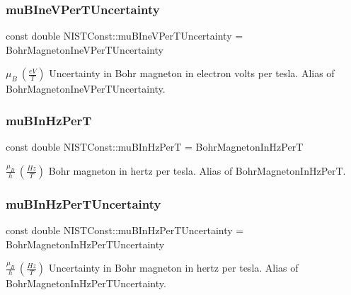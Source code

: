 \subsubsection{\texorpdfstring{mu\+B\+Ine\+V\+Per\+T\+Uncertainty}{muBIneVPerTUncertainty}}
{\footnotesize\ttfamily const double N\+I\+S\+T\+Const\+::mu\+B\+Ine\+V\+Per\+T\+Uncertainty = Bohr\+Magneton\+Ine\+V\+Per\+T\+Uncertainty}

$\mu_B \ (\frac{eV}{T})$ Uncertainty in Bohr magneton in electron volts per tesla. Alias of Bohr\+Magneton\+Ine\+V\+Per\+T\+Uncertainty. \mbox{\label{group___n_i_s_t_const-_bohr_magneton_gac590bf03985de37cfaeea7982dac2aa8}} 
\subsubsection{\texorpdfstring{mu\+B\+In\+Hz\+PerT}{muBInHzPerT}}
{\footnotesize\ttfamily const double N\+I\+S\+T\+Const\+::mu\+B\+In\+Hz\+PerT = Bohr\+Magneton\+In\+Hz\+PerT}

$\frac{\mu_B}{h} \ (\frac{Hz}{T})$ Bohr magneton in hertz per tesla. Alias of Bohr\+Magneton\+In\+Hz\+PerT. \mbox{\label{group___n_i_s_t_const-_bohr_magneton_gadcf78ed6cafce3517c8dc7d308c06cc2}} 
\subsubsection{\texorpdfstring{mu\+B\+In\+Hz\+Per\+T\+Uncertainty}{muBInHzPerTUncertainty}}
{\footnotesize\ttfamily const double N\+I\+S\+T\+Const\+::mu\+B\+In\+Hz\+Per\+T\+Uncertainty = Bohr\+Magneton\+In\+Hz\+Per\+T\+Uncertainty}

$\frac{\mu_B}{h} \ (\frac{Hz}{T})$ Uncertainty in Bohr magneton in hertz per tesla. Alias of Bohr\+Magneton\+In\+Hz\+Per\+T\+Uncertainty. \mbox{\label{group___n_i_s_t_const-_bohr_magneton_ga4d426841ef01963272df91bd0534a966}} 
